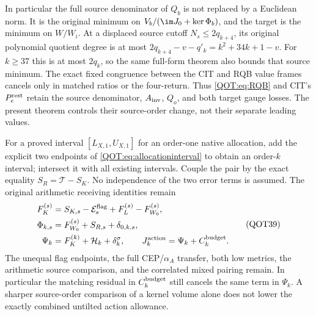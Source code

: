 \documentclass[11pt,a4paper]{article}
\begin{document}
In particular the full source denominator of $Q_b$ is not replaced by a Euclidean norm. It is the original minimum on $V_b/(\im J_0+\ker\Phi_b)$, and the target is the minimum on $W/W_i$. At a displaced source cutoff $N_s\le2q_{k+4}$, its original polynomial quotient degree is at most $2q_{k+4}-v-q'_k=k^2+34k+1-v$. For $k\ge37$ this is at most $2q_k$, so the same full-form theorem also bounds that source minimum. The exact fixed congruence between the CIT and RQB value frames cancels only in matched ratios or the four-return. Thus \eqref{QOT:eq:RQB} and CIT's $P_e^{\rm rest}$ retain the source denominator, $A_{\rm inv}$, $Q_o$, and both target gauge losses. The present theorem controls their source-order change, not their separate leading values.

For a proved interval $[L_{X,1},U_{X,1}]$ for an order-one native allocation, add the explicit two endpoints of \eqref{QOT:eq:allocationinterval} to obtain an order-$k$ interval; intersect it with all existing intervals. Couple the pair by the exact equality $S_R=\mathcal T-S_K$. No independence of the two error terms is assumed. The original arithmetic receiving identities remain
\begin{equation}
\begin{split}
 F_K^{(s)}&=S_{K,s}-\mathcal E_s^{\rm flag}+F_L^{(s)}-F_{W_0}^{(s)},\\
 \Phi_{k,s}&=F_{W_0}^{(s)}+S_{R,s}+\delta_{0,k,s},\\
 \Psi_k&=F_K^{(k)}+\mathcal H_k+\delta_k^\sigma,
 \qquad J_k^{\rm action}=\Psi_k+C_k^{\rm budget}.
\end{split}\label{QOT:eq:return}
\tag{QOT39}
\end{equation}
The unequal flag endpoints, the full CEP/$\alpha_A$ transfer, both low metrics, the arithmetic source comparison, and the correlated mixed pairing remain. In particular the matching residual in $C_k^{\rm budget}$ still cancels the same term in $\Psi_k$. A sharper source-order comparison of a kernel volume alone does not lower the exactly combined untilted action allowance.
\end{document}
